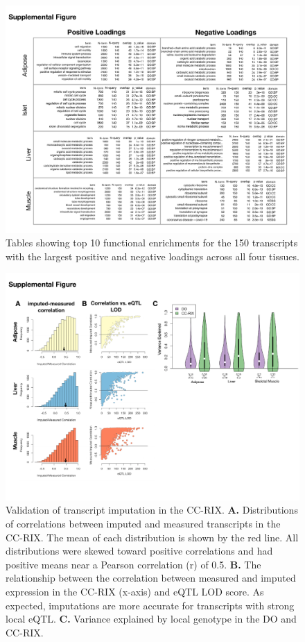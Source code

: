 \documentclass[
]{article}
\begin{document}
\begin{figure}[ht!]
\includegraphics[width=\textwidth]{Figures/Supp_Fig_enrichments.pdf} 
\caption{Tables showing top 10 functional enrichments for 
the 150 transcripts with the largest positive and negative 
loadings across all four tissues.
}
\label{fig:top_enrich}
\end{figure}

\begin{figure}[ht!]
\includegraphics[width=\textwidth]{Figures/Supp_Fig_CC-RIX_Imputation.pdf} 
\caption{Validation of transcript imputation in the CC-RIX. \textbf{A.} 
Distributions of correlations between imputed and measured transcripts 
in the CC-RIX. The mean of each distribution is shown by the red line. 
All distributions were skewed toward positive correlations and had
 positive means near a Pearson correlation (r) of 0.5. \textbf{B.} 
 The relationship between the correlation between measured and 
 imputed expression in the CC-RIX (x-axis) and eQTL LOD score. As 
 expected, imputations are more accurate for transcripts with strong 
 local eQTL. \textbf{C.} Variance explained by local genotype in the 
 DO and CC-RIX. 
}
\label{fig:cc_imputation}
\end{figure}

\pagebreak



\end{document}
